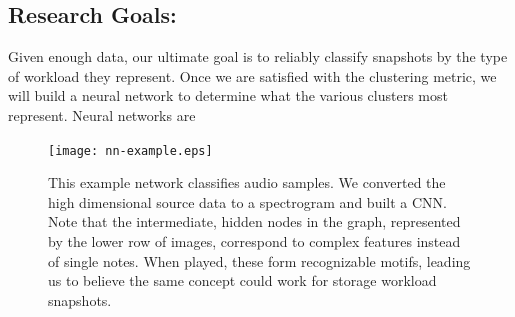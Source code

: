 


\subsection*{Research Goals: }
Given enough data, our ultimate goal is to reliably classify snapshots
by the type of workload they represent. Once we are satisfied with the clustering metric, we will build a neural network to determine what \mws the various clusters most represent. 
Neural networks are %

\begin{figure}
    \centering
    \texttt{[image: nn-example.eps]}
    \caption{This example network classifies audio samples.  We converted the high dimensional source data to a spectrogram and built a CNN.  Note that the intermediate, hidden nodes in the graph, represented by the lower row of images, correspond to complex features instead of single notes.  When played, these form recognizable motifs, leading us to believe the same concept could work for storage workload snapshots.}
    \label{fig:nn}
\end{figure}


